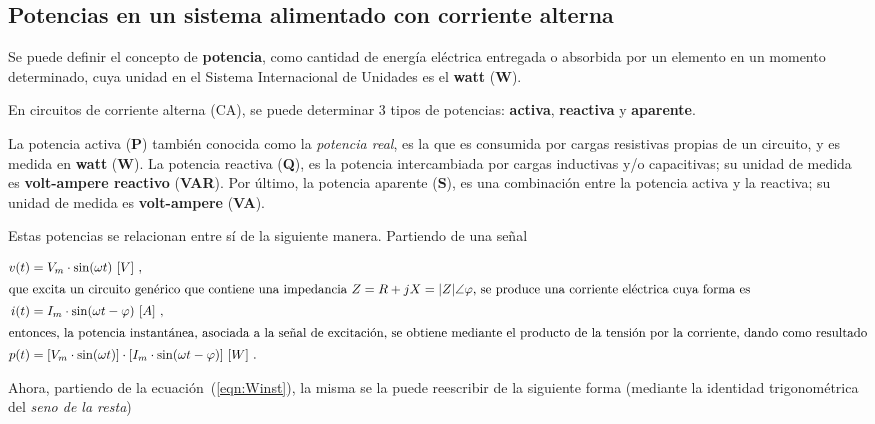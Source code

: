 \subsection{Potencias en un sistema alimentado con corriente alterna}

   Se puede definir el concepto de \textbf{potencia}, como cantidad de energía eléctrica 
  entregada o absorbida por un elemento en un momento determinado, cuya unidad en el Sistema 
  Internacional de Unidades es el \textbf{watt} (\textbf{W}).

   En circuitos de corriente alterna (CA), se puede determinar 3 tipos de potencias:
   \textbf{activa}, \textbf{reactiva} y \textbf{aparente}.

  La potencia activa (\textbf{P}) también conocida como la \textit{potencia real}, es la que
  es consumida por cargas resistivas propias de un circuito, y es medida 
  en \textbf{watt} (\textbf{W}). La potencia reactiva (\textbf{Q}), es la potencia 
  intercambiada por cargas inductivas y/o capacitivas; su unidad de medida es 
  \textbf{volt-ampere reactivo} (\textbf{VAR}). Por último, la potencia aparente (\textbf{S}),
  es una combinación entre la potencia activa y la reactiva; su unidad de medida es 
  \textbf{volt-ampere } (\textbf{VA}).

  Estas potencias se relacionan entre sí de la siguiente manera. Partiendo de una señal

        \vspace{-15pt}  
        \begin{align}
            v(t)   &= V_m \cdot \sin(\omega t)\ [V] ~, \notag \\
            \intertext{que excita un circuito genérico que contiene una impedancia 
                        $Z = R + jX = |Z| \angle \varphi$,  se produce una corriente
                        eléctrica cuya forma es}
            i(t)   &= I_m \cdot \sin(\omega t - \varphi)\ [A] \ , \notag \\
            \intertext{entonces, la potencia instantánea, asociada a la señal de 
                excitación, se obtiene mediante el producto de la tensión por la 
                corriente, dando como resultado}
            p(t)  &= [V_m \cdot \sin(\omega t)] 
            \cdot [I_m \cdot \sin(\omega t - \varphi)]\ [W]  ~.
                            \label{eqn:Winst}
         \end{align}

      
    Ahora, partiendo de la ecuación~(\ref{eqn:Winst}), la misma se la puede reescribir de la
    siguiente forma (mediante la identidad trigonométrica del \textit{seno de la resta})

